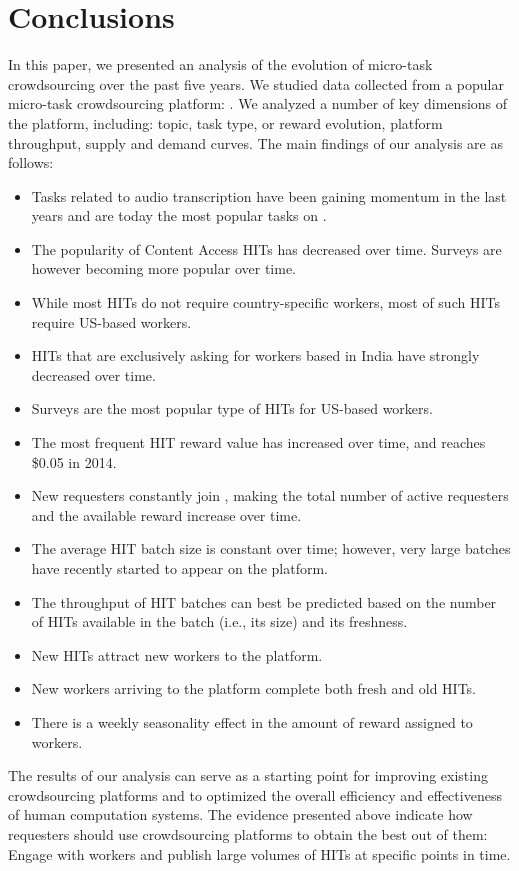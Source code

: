 \section{Conclusions}\label{sec:conc}

In this paper, we presented an analysis of the evolution of micro-task crowdsourcing over the past five years.
We studied data collected from a popular micro-task crowdsourcing platform: \amt{}.
We analyzed a number of key dimensions of the platform, including: topic, task type, or reward evolution, platform throughput, supply and demand curves.
The main findings of our analysis are as follows:
\begin{itemize}[noitemsep,topsep=0pt,parsep=0pt,partopsep=0pt]
	\item Tasks related to audio transcription have been gaining momentum in the last years and are today the most popular tasks on \amt{}.
	\item The popularity of Content Access HITs has decreased over time. Surveys are however becoming more popular over time.
	\item While most HITs do not require country-specific workers, most of such HITs require US-based workers.
	\item HITs that are exclusively asking for workers based in India have strongly decreased over time.
	\item Surveys are the most popular type of HITs for US-based workers.
	\item The most frequent HIT reward value has increased over time, and reaches \$0.05 in 2014.
	\item New requesters constantly join \amt{}, making the total number of active requesters and the available reward increase over time.
	\item The average HIT batch size is constant over time; however, very large batches have recently started to appear on the platform.
	\item The throughput of HIT batches can best be predicted based on the number of HITs available in the batch (i.e., its size) and its freshness.
	\item New HITs attract new workers to the platform.
	\item New workers arriving to the platform complete both fresh and old HITs.
	\item There is a weekly seasonality effect in the amount of reward assigned to workers.
\end{itemize}

The results of our analysis can serve as a starting point for improving existing crowdsourcing platforms and to optimized the overall efficiency and effectiveness of human computation systems. The evidence presented above  indicate how requesters should use crowdsourcing platforms to obtain the best out of them: Engage with workers and publish large volumes of HITs at specific points in time. 

